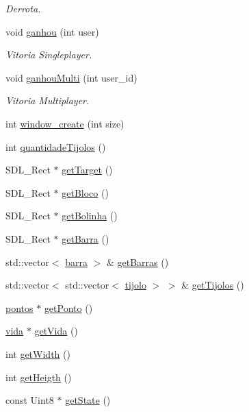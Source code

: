 \begin{DoxyCompactItemize}
\begin{DoxyCompactList}\small\item\em Derrota. \end{DoxyCompactList}\item 
void \hyperlink{classview_af4509b82ea85ae1e29b0fa51e2156f73}{ganhou} (int user)
\begin{DoxyCompactList}\small\item\em Vitoria Singleplayer. \end{DoxyCompactList}\item 
void \hyperlink{classview_a81553c85d81a253c49b002440a039fd3}{ganhou\+Multi} (int user\+\_\+id)
\begin{DoxyCompactList}\small\item\em Vitoria Multiplayer. \end{DoxyCompactList}\item 
int \hyperlink{classview_a987e7c197e87c90671d6f5347d2dab9d}{window\+\_\+create} (int size)
\item 
int \hyperlink{classview_a257d50065961954053fbf5402b2e2968}{quantidade\+Tijolos} ()
\item 
S\+D\+L\+\_\+\+Rect $\ast$ \hyperlink{classview_a4bf37f4171f4bb15c0e5b4ab8c2a9faa}{get\+Target} ()
\item 
S\+D\+L\+\_\+\+Rect $\ast$ \hyperlink{classview_a8b12f1f06de39d6e9f70f54a9281e05c}{get\+Bloco} ()
\item 
S\+D\+L\+\_\+\+Rect $\ast$ \hyperlink{classview_a8eb9d89d9b55a5d2ee529c96e0dc246a}{get\+Bolinha} ()
\item 
S\+D\+L\+\_\+\+Rect $\ast$ \hyperlink{classview_a57b60e5da21e0484081d71c69ba4d03e}{get\+Barra} ()
\item 
std\+::vector$<$ \hyperlink{classbarra}{barra} $>$ \& \hyperlink{classview_abae031de8054f66f9b0e7a5caabdc513}{get\+Barras} ()
\item 
std\+::vector$<$ std\+::vector$<$ \hyperlink{classtijolo}{tijolo} $>$ $>$ \& \hyperlink{classview_aba52b9c597c0b8acfacf96f21547977a}{get\+Tijolos} ()
\item 
\hyperlink{classpontos}{pontos} $\ast$ \hyperlink{classview_a6cd53aa4df2642579992803a18f0bc8b}{get\+Ponto} ()
\item 
\hyperlink{classvida}{vida} $\ast$ \hyperlink{classview_aa33f3e6bf59ada95ee9fd0bff5af22c0}{get\+Vida} ()
\item 
int \hyperlink{classview_aba1c490d357bb58f4aa9218cb96b42b0}{get\+Width} ()
\item 
int \hyperlink{classview_af2cf0c4a4d7cd84f0155ae1ad6a51d0a}{get\+Heigth} ()
\item 
const Uint8 $\ast$ \hyperlink{classview_a5dd0f6c8f5d5f9123353986607c7fb77}{get\+State} ()
\end{DoxyCompactItemize}
